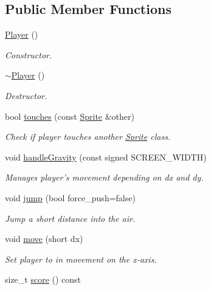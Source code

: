 \subsection*{Public Member Functions}
\begin{DoxyCompactItemize}
\item 
\hyperlink{classPlayer_affe0cc3cb714f6deb4e62f0c0d3f1fd8}{Player} ()
\begin{DoxyCompactList}\small\item\em Constructor. \end{DoxyCompactList}\item 
\hyperlink{classPlayer_a749d2c00e1fe0f5c2746f7505a58c062}{$\sim$\-Player} ()
\begin{DoxyCompactList}\small\item\em Destructor. \end{DoxyCompactList}\item 
bool \hyperlink{classPlayer_a83bceadff4531bcd4d8a1112bdd9761c}{touches} (const \hyperlink{classSprite}{Sprite} \&other)
\begin{DoxyCompactList}\small\item\em Check if player touches another \hyperlink{classSprite}{Sprite} class. \end{DoxyCompactList}\item 
void \hyperlink{classPlayer_a27fc37febc547d8d030b24ddae6c10cf}{handle\-Gravity} (const signed S\-C\-R\-E\-E\-N\-\_\-\-W\-I\-D\-T\-H)
\begin{DoxyCompactList}\small\item\em Manages player's movement depending on dx and dy. \end{DoxyCompactList}\item 
void \hyperlink{classPlayer_a1304b1190f969212483e81ae85e86282}{jump} (bool force\-\_\-push=false)
\begin{DoxyCompactList}\small\item\em Jump a short distance into the air. \end{DoxyCompactList}\item 
void \hyperlink{classPlayer_ae9c07ea7f8980451fc2070bb5a76f06f}{move} (short dx)
\begin{DoxyCompactList}\small\item\em Set player to in movement on the x-\/axis. \end{DoxyCompactList}\item 
size\-\_\-t \hyperlink{classPlayer_ad14b6cfb4372d370c1dde79e51107098}{score} () const 
\end{DoxyCompactItemize}
